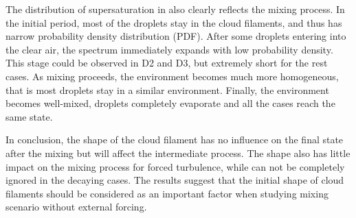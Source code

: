 The distribution of supersaturation in  also clearly
reflects the mixing process. In the initial period, most of the droplets stay
in the cloud filaments, and thus has narrow probability density distribution
(PDF). After some droplets entering into the clear air, the spectrum
immediately expands with low probability density. This stage could be observed
in D2 and D3, but extremely short for the rest cases. As mixing proceeds, the
environment becomes much more homogeneous, that is most droplets stay in a
similar environment. Finally, the environment becomes well-mixed, droplets
completely evaporate and all the cases reach the same state. 

In conclusion, the shape of the cloud
filament has no influence on the final state after the mixing but will affect
the intermediate process. The shape also has little impact on the mixing
process for forced turbulence, while can not be completely ignored in the
decaying cases. The results suggest that the initial shape of cloud filaments
should be considered as an important factor when studying mixing scenario
without external forcing.

\begin{figure}[H]\centering
{}
\end{figure}

